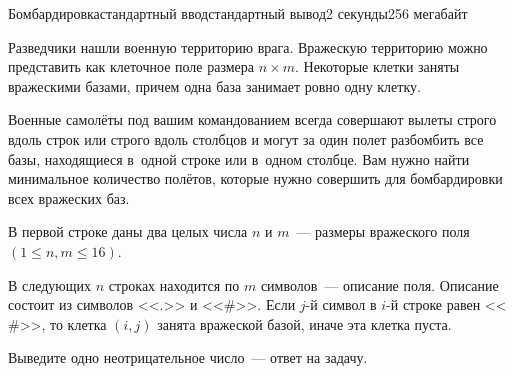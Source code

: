\begin{problem}{Бомбардировка}{стандартный ввод}{стандартный вывод}{2 секунды}{256 мегабайт}

Разведчики нашли военную территорию врага. Вражескую территорию можно представить как клеточное поле размера $n \times m$. Некоторые клетки заняты вражескими базами, причем одна база занимает ровно одну клетку.

Военные самолёты под вашим командованием всегда совершают вылеты строго вдоль строк или строго вдоль столбцов и могут за один полет разбомбить все базы, находящиеся в~одной строке или в~одном столбце. Вам нужно найти минимальное количество полётов, которые нужно совершить для бомбардировки всех вражеских баз. 

\InputFile
В первой строке даны два целых числа $n$ и $m$~--- размеры вражеского поля $(1 \leq n,m \leq 16)$.

В следующих $n$ строках находится по $m$ символов~--- описание поля. Описание состоит из символов <<$.$>> и <<$\#$>>.  Если $j$-й символ в $i$-й строке равен <<$\#$>>, то клетка $(i,j)$ занята вражеской базой, иначе эта клетка пуста.

\OutputFile
Выведите одно неотрицательное число~--- ответ на задачу.

\Examples

\begin{example}
%
%
%
\end{example}

\end{problem}

